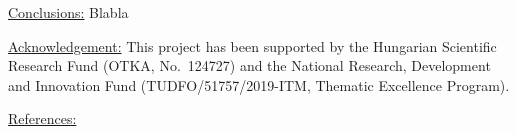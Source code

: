 \documentclass{article}
\begin{document}
\vspace{1em}
\noindent\underline{Conclusions:}\vspace{0.2em}\newline
Blabla

\vspace{1em}
\noindent\underline{Acknowledgement:}\vspace{0.2em}\newline
This project has been supported by the Hungarian Scientific Research Fund (OTKA, No.~124727)
and the National Research, Development and Innovation Fund
(TUDFO/51757/2019-ITM, Thematic Excellence Program).

\vspace{1em}
\noindent\underline{References:}\vspace{-1.9em}\newline
\renewcommand{\section}[2]{}
\end{document}
